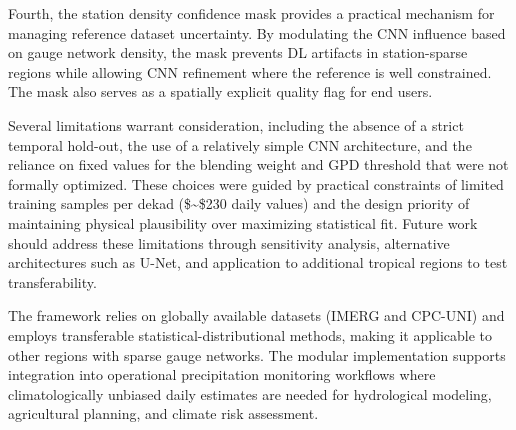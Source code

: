 \documentclass[
]{article}
\begin{document}
Fourth, the station density confidence mask provides a practical
mechanism for managing reference dataset uncertainty. By modulating the
CNN influence based on gauge network density, the mask prevents DL
artifacts in station-sparse regions while allowing CNN refinement where
the reference is well constrained. The mask also serves as a spatially
explicit quality flag for end users.

Several limitations warrant consideration, including the absence of a
strict temporal hold-out, the use of a relatively simple CNN
architecture, and the reliance on fixed values for the blending weight
and GPD threshold that were not formally optimized. These choices were
guided by practical constraints of limited training samples per dekad
(\$\sim\$230 daily values) and the design priority of maintaining
physical plausibility over maximizing statistical fit. Future work
should address these limitations through sensitivity analysis,
alternative architectures such as U-Net, and application to additional
tropical regions to test transferability.

The framework relies on globally available datasets (IMERG and CPC-UNI)
and employs transferable statistical-distributional methods, making it
applicable to other regions with sparse gauge networks. The modular
implementation supports integration into operational precipitation
monitoring workflows where climatologically unbiased daily estimates are
needed for hydrological modeling, agricultural planning, and climate
risk assessment.
\end{document}
